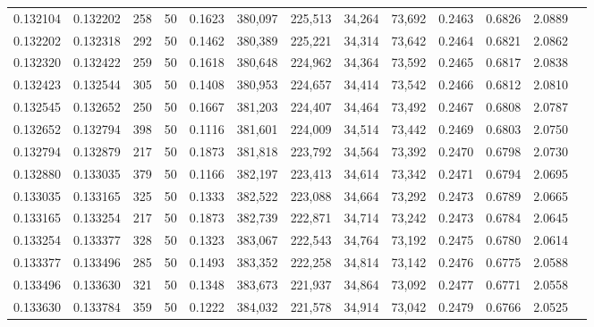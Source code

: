 \begin{tabular}{rrrrrrrrrrrrr}
0.132104 & 0.132202 &   258 &  50 &                                     0.1623 & 380,097 & 225,513 &  34,264 &  73,692 & 0.2463 & 0.6826 & 2.0889 \\
0.132202 & 0.132318 &   292 &  50 &                                     0.1462 & 380,389 & 225,221 &  34,314 &  73,642 & 0.2464 & 0.6821 & 2.0862 \\
0.132320 & 0.132422 &   259 &  50 &                                     0.1618 & 380,648 & 224,962 &  34,364 &  73,592 & 0.2465 & 0.6817 & 2.0838 \\
0.132423 & 0.132544 &   305 &  50 &                                     0.1408 & 380,953 & 224,657 &  34,414 &  73,542 & 0.2466 & 0.6812 & 2.0810 \\
0.132545 & 0.132652 &   250 &  50 &                                     0.1667 & 381,203 & 224,407 &  34,464 &  73,492 & 0.2467 & 0.6808 & 2.0787 \\
0.132652 & 0.132794 &   398 &  50 &                                     0.1116 & 381,601 & 224,009 &  34,514 &  73,442 & 0.2469 & 0.6803 & 2.0750 \\
0.132794 & 0.132879 &   217 &  50 &                                     0.1873 & 381,818 & 223,792 &  34,564 &  73,392 & 0.2470 & 0.6798 & 2.0730 \\
0.132880 & 0.133035 &   379 &  50 &                                     0.1166 & 382,197 & 223,413 &  34,614 &  73,342 & 0.2471 & 0.6794 & 2.0695 \\
0.133035 & 0.133165 &   325 &  50 &                                     0.1333 & 382,522 & 223,088 &  34,664 &  73,292 & 0.2473 & 0.6789 & 2.0665 \\
0.133165 & 0.133254 &   217 &  50 &                                     0.1873 & 382,739 & 222,871 &  34,714 &  73,242 & 0.2473 & 0.6784 & 2.0645 \\
0.133254 & 0.133377 &   328 &  50 &                                     0.1323 & 383,067 & 222,543 &  34,764 &  73,192 & 0.2475 & 0.6780 & 2.0614 \\
0.133377 & 0.133496 &   285 &  50 &                                     0.1493 & 383,352 & 222,258 &  34,814 &  73,142 & 0.2476 & 0.6775 & 2.0588 \\
0.133496 & 0.133630 &   321 &  50 &                                     0.1348 & 383,673 & 221,937 &  34,864 &  73,092 & 0.2477 & 0.6771 & 2.0558 \\
0.133630 & 0.133784 &   359 &  50 &                                     0.1222 & 384,032 & 221,578 &  34,914 &  73,042 & 0.2479 & 0.6766 & 2.0525 \\

\end{tabular}
